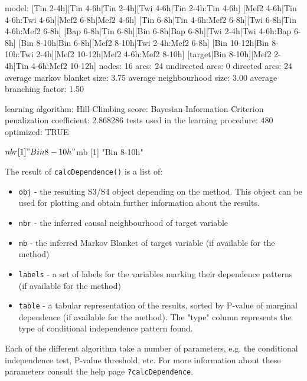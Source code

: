 \documentclass{article}
\newcommand{\Rfun}[1]{{\texttt{#1}}}
\newcommand{\Robj}[1]{{\texttt{#1}}}
\begin{document}
\begin{Schunk}
\begin{Soutput}
  model:
   [Tin 2-4h][Tin 4-6h|Tin 2-4h][Twi 4-6h|Tin 2-4h:Tin 4-6h]
   [Mef2 4-6h|Tin 4-6h:Twi 4-6h][Mef2 6-8h|Mef2 4-6h]
   [Tin 6-8h|Tin 4-6h:Mef2 6-8h][Twi 6-8h|Tin 4-6h:Mef2 6-8h]
   [Bap 6-8h|Tin 6-8h][Bin 6-8h|Bap 6-8h][Twi 2-4h|Twi 4-6h:Bap 6-8h]
   [Bin 8-10h|Bin 6-8h][Mef2 8-10h|Twi 2-4h:Mef2 6-8h]
   [Bin 10-12h|Bin 8-10h:Twi 2-4h][Mef2 10-12h|Mef2 4-6h:Mef2 8-10h]
   [target|Bin 8-10h][Mef2 2-4h|Tin 4-6h:Mef2 10-12h]
  nodes:                                 16 
  arcs:                                  24 
    undirected arcs:                     0 
    directed arcs:                       24 
  average markov blanket size:           3.75 
  average neighbourhood size:            3.00 
  average branching factor:              1.50 

  learning algorithm:                    Hill-Climbing 
  score:                                 
                                         Bayesian Information Criterion 
  penalization coefficient:              2.868286 
  tests used in the learning procedure:  480 
  optimized:                             TRUE 


$nbr
[1] "Bin 8-10h"

$mb
[1] "Bin 8-10h"
\end{Soutput}
\end{Schunk}

The result of \Rfun{calcDependence()} is a list of:
\begin{itemize}
\item \Robj{obj} - the resulting S3/S4 object depending on the method. This object can be used for plotting and obtain further information about the results.
\item \Robj{nbr} - the inferred causal neighbourhood of target variable
\item \Robj{mb} - the inferred Markov Blanket of target variable (if available for the method)
\item \Robj{labels} - a set of labels for the variables marking their dependence patterns (if available for the method)
\item \Robj{table} - a tabular representation of the results, sorted by P-value of marginal dependence (if available for the method). The "type" column represents the type of conditional independence pattern found. 
\end{itemize}

Each of the different algorithm take a number of parameters, e.g. the conditional independence test, P-value threshold, etc. For more information about these parameters consult the help page \Robj{?calcDependence}. 
\end{document}
